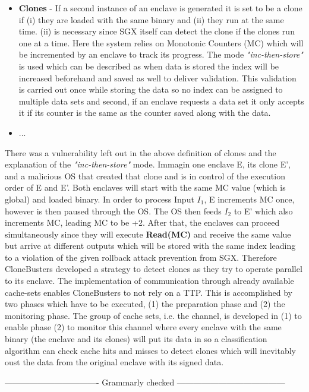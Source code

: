 \begin{itemize}
    \item \textbf{Clones} - If a second instance of an enclave is generated it is set to be a clone if (i) they are loaded with the same binary and (ii) they run at the same time. (ii) is necessary since SGX itself can detect the clone if the clones run one at a time. Here the system relies on Monotonic Counters (MC) which will be incremented by an enclave to track its progress. The mode \textit{"inc-then-store"} is used which can be described as when data is stored the index will be increased beforehand and saved as well to deliver validation. This validation is carried out once while storing the data so no index can be assigned to multiple data sets and second, if an enclave requests a data set it only accepts it if its counter is the same as the counter saved along with the data.
    \item ...
\end{itemize} 

There was a vulnerability left out in the above definition of clones and the explanation of the \textit{"inc-then-store"} mode. Immagin one enclave E, its clone E', and a malicious OS that created that clone and is in control of the execution order of E and E'. Both enclaves will start with the same MC value (which is global) and loaded binary. In order to process Input \(I_1\), E increments MC once, however is then paused through the OS. The OS then feeds \(I_2\) to E' which also increments MC, leading MC to be +2. After that, the enclaves can proceed simultaneously since they will execute \textbf{Read(MC)} and receive the same value but arrive at different outputs which will be stored with the same index leading to a violation of the given rollback attack prevention from SGX. Therefore CloneBusters developed a strategy to detect clones as they try to operate parallel to its enclave. The implementation of communication through already available cache-sets enables CloneBusters to not rely on a TTP. This is accomplished by two phases which have to be executed, (1) the preparation phase and (2) the monitoring phase. The group of cache sets, i.e. the channel, is developed in (1) to enable phase (2) to monitor this channel where every enclave with the same binary (the enclave and its clones) will put its data in so a classification algorithm can check cache hits and misses to detect clones which will inevitably oust the data from the original enclave with its signed data.

---------------------------------- Grammarly checked ---------------------------------------


